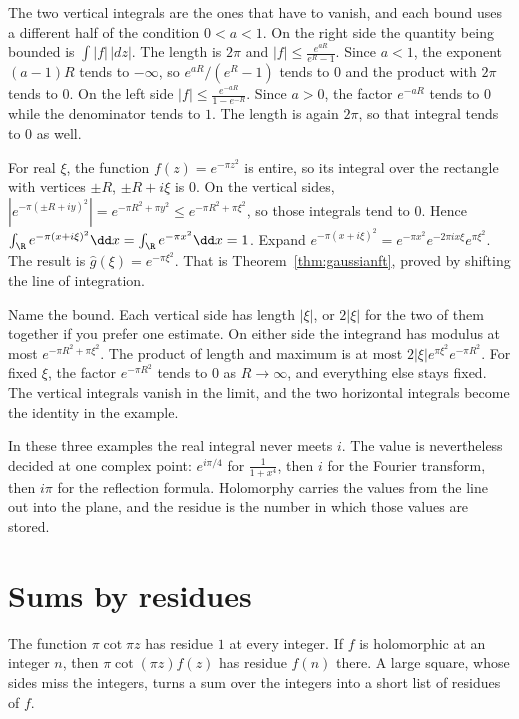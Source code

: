 The two vertical integrals are the ones that have to vanish, and each bound uses a different half of the condition $0<a<1$. On the right side the quantity being bounded is $\int |f|\,|dz|$. The length is $2\pi$ and $|f|\le\frac{e^{aR}}{e^R-1}$. Since $a<1$, the exponent $(a-1)R$ tends to $-\infty$, so $e^{aR}/(e^R-1)$ tends to $0$ and the product with $2\pi$ tends to $0$. On the left side $|f|\le\frac{e^{-aR}}{1-e^{-R}}$. Since $a>0$, the factor $e^{-aR}$ tends to $0$ while the denominator tends to $1$. The length is again $2\pi$, so that integral tends to $0$ as well.

\begin{example}
For real $\xi$, the function $f(z)=e^{-\pi z^2}$ is entire, so its integral over the rectangle with vertices $\pm R$, $\pm R+i\xi$ is $0$. On the vertical sides, $|e^{-\pi(\pm R+iy)^2}|=e^{-\pi R^2+\pi y^2}\le e^{-\pi R^2+\pi\xi^2}$, so those integrals tend to $0$. Hence $\int_{\R}e^{-\pi(x+i\xi)^2}\dd x=\int_{\R}e^{-\pi x^2}\dd x=1$. Expand $e^{-\pi(x+i\xi)^2}=e^{-\pi x^2}e^{-2\pi ix\xi}e^{\pi\xi^2}$. The result is $\hat g(\xi)=e^{-\pi\xi^2}$. That is Theorem~\ref{thm:gaussianft}, proved by shifting the line of integration.
\end{example}

Name the bound. Each vertical side has length $|\xi|$, or $2|\xi|$ for the two of them together if you prefer one estimate. On either side the integrand has modulus at most $e^{-\pi R^2+\pi\xi^2}$. The product of length and maximum is at most $2|\xi|e^{\pi\xi^2}e^{-\pi R^2}$. For fixed $\xi$, the factor $e^{-\pi R^2}$ tends to $0$ as $R\to\infty$, and everything else stays fixed. The vertical integrals vanish in the limit, and the two horizontal integrals become the identity in the example.

\begin{beauty}
In these three examples the real integral never meets $i$. The value is nevertheless decided at one complex point: $e^{i\pi/4}$ for $\frac1{1+x^4}$, then $i$ for the Fourier transform, then $i\pi$ for the reflection formula. Holomorphy carries the values from the line out into the plane, and the residue is the number in which those values are stored.
\end{beauty}

\section{Sums by residues}

The function $\pi\cot\pi z$ has residue $1$ at every integer. If $f$ is holomorphic at an integer $n$, then $\pi\cot(\pi z)f(z)$ has residue $f(n)$ there. A large square, whose sides miss the integers, turns a sum over the integers into a short list of residues of $f$.

